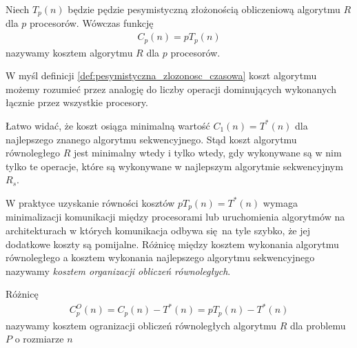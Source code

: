 \begin{definicja}
Niech \(T_{p}(n)\) będzie pędzie pesymistyczną złożonością obliczeniową algorytmu \(R\) dla \(p\) procesorów. Wówczas funkcję
\begin{align}
C_{p}(n) = p T_{p}(n)
\end{align}
nazywamy kosztem algorytmu \(R\) dla \(p\) procesorów.
\end{definicja}

W myśl definicji \ref{def:pesymistyczna_zlozonosc_czasowa} koszt algorytmu możemy rozumieć przez analogię do liczby operacji dominujących wykonanych łącznie przez wszystkie procesory. 

\begin{wniosek}
Łatwo widać, że koszt osiąga minimalną wartość \(C_{1}(n) = T^{*}(n)\) dla  najlepszego znanego algorytmu sekwencyjnego. Stąd koszt algorytmu równoległego \(R\) jest minimalny wtedy i tylko wtedy, gdy wykonywane są w nim tylko te operacje, które są wykonywane w najlepszym algorytmie sekwencyjnym \(R_s\).
\end{wniosek}

\begin{uwaga}
W praktyce uzyskanie równości kosztów \(pT_{p}(n)=T^{*}(n)\) wymaga minimalizacji komunikacji między procesorami lub uruchomienia algorytmów na architekturach w których komunikacja odbywa się na tyle szybko, że jej dodatkowe koszty są pomijalne. Różnicę między kosztem wykonania algorytmu równoległego a kosztem wykonania najlepszego algorytmu sekwencyjnego nazywamy \emph{kosztem organizacji obliczeń równoległych}.
\end{uwaga}

\begin{definicja}
Różnicę 
\begin{align}
C_{p}^{O}(n) = C_{p}(n) - T^{*}(n) = pT_{p}(n) - T^{*}(n)
\end{align}
nazywamy kosztem ogranizacji obliczeń równoległych algorytmu \(R\) dla problemu \(P\) o rozmiarze \(n\)
\end{definicja}